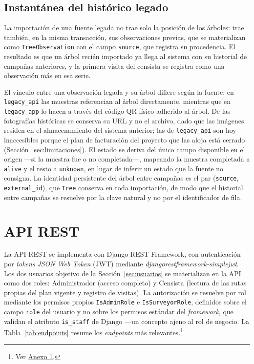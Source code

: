 \subsection{Instantánea del histórico legado}

La importación de una fuente legada no trae solo la posición de los árboles: trae también, en la
misma transacción, sus observaciones previas, que se materializan como \texttt{TreeObservation} con
el campo \texttt{source}, que registra su procedencia. El resultado es que un árbol recién importado
ya llega al sistema con su historial de campañas anteriores, y la primera visita del censista se
registra como una observación más en esa serie.

El vínculo entre una observación legada y su árbol difiere según la fuente: en \texttt{legacy\_api}
las muestras referencian al árbol directamente, mientras que en \texttt{legacy\_app} lo hacen a
través del código QR físico adherido al árbol. De las fotografías históricas se conserva su URL y
no el archivo, dado que las imágenes residen en el almacenamiento del sistema anterior; las de
\texttt{legacy\_api} son hoy inaccesibles porque el plan de facturación del proyecto que las aloja
está cerrado (Sección~\ref{sec:limitaciones}). El estado se deriva del único campo disponible en el
origen ---si la muestra fue o no completada---, mapeando la muestra completada a \texttt{alive} y
el resto a \texttt{unknown}, en lugar de inferir un estado que la fuente no consigna. La identidad
persistente del árbol entre campañas es el par (\texttt{source}, \texttt{external\_id}), que
\texttt{Tree} conserva en toda importación, de modo que el historial entre campañas se resuelve por
la clave natural y no por el identificador de fila.

\section{API REST}
\label{sec:api}

La API REST se implementa con Django REST Framework, con autenticación por \textit{tokens}
\textit{JSON Web Token} (JWT) mediante \textit{djangorestframework-simplejwt}.
Los dos usuarios objetivo de la Sección~\ref{sec:usuarios} se materializan en la API como dos roles:
Administrador (acceso completo) y Censista (lectura de las rutas propias del plan vigente y registro
de visitas). La autorización se resuelve por rol mediante los
permisos propios \texttt{IsAdminRole} e \texttt{IsSurveyorRole}, definidos sobre el campo
\texttt{role} del usuario y no sobre los permisos estándar del \textit{framework}, que validan el
atributo \texttt{is\_staff} de Django ---un concepto ajeno al rol de negocio. La
Tabla~\ref{tab:endpoints} resume los \textit{endpoints} más relevantes.\footnote{Ver \hyperref[anx:api]{Anexo 1}.}

